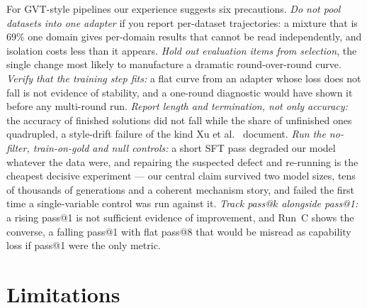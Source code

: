 \documentclass[runningheads]{llncs}
\begin{document}
For GVT-style pipelines our experience suggests six precautions.
\emph{Do not pool datasets into one adapter} if you report per-dataset
trajectories: a mixture that is $69\%$ one domain gives per-domain results that
cannot be read independently, and isolation costs less than it appears.
\emph{Hold out evaluation items from selection}, the single change most likely to
manufacture a dramatic round-over-round curve.
\emph{Verify that the training step fits:} a flat curve from an adapter whose loss
does not fall is not evidence of stability, and a one-round diagnostic would have
shown it before any multi-round run.
\emph{Report length and termination, not only accuracy:} the accuracy of finished
solutions did not fall while the share of unfinished ones quadrupled, a style-drift
failure of the kind Xu et al.~\cite{ref_phantom} document.
\emph{Run the no-filter, train-on-gold and null controls:} a short SFT pass
degraded our model whatever the data were, and repairing the suspected defect and
re-running is the cheapest decisive experiment --- our central claim survived two
model sizes, tens of thousands of generations and a coherent mechanism story, and
failed the first time a single-variable control was run against it.
\emph{Track pass@$k$ alongside pass@1:} a rising pass@1 is not sufficient evidence
of improvement, and Run~C shows the converse, a falling pass@1 with flat pass@8
that would be misread as capability loss if pass@1 were the only metric.

\section{Limitations}
\label{sec:limitations}
\end{document}
